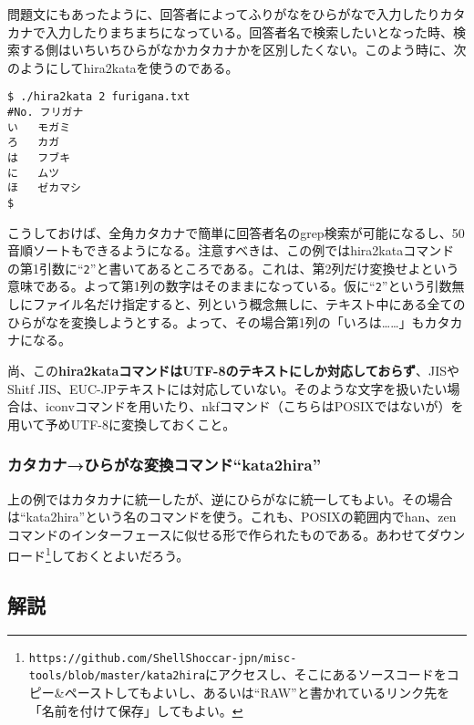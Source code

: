 問題文にもあったように、回答者によってふりがなをひらがなで入力したりカタカナで入力したりまちまちになっている。回答者名で検索したいとなった時、検索する側はいちいちひらがなかカタカナかを区別したくない。このよう時に、次のようにしてhira2kataを使うのである。
\begin{screen}
	\verb!$ ./hira2kata 2 furigana.txt! \return \\
	\verb|#No. フリガナ| \\
	\verb|い   モガミ| \\
	\verb|ろ   カガ| \\
	\verb|は   フブキ| \\
	\verb|に   ムツ| \\
	\verb|ほ   ゼカマシ| \\
	\verb|$ |
\end{screen}

こうしておけば、全角カタカナで簡単に回答者名のgrep検索が可能になるし、50音順ソートもできるようになる。注意すべきは、この例ではhira2kataコマンドの第1引数に``\verb|2|''と書いてあるところである。これは、第2列だけ変換せよという意味である。よって第1列の数字はそのままになっている。仮に``\verb|2|''という引数無しにファイル名だけ指定すると、列という概念無しに、テキスト中にある全てのひらがなを変換しようとする。よって、その場合第1列の「いろは……」もカタカナになる。

尚、この\textbf{hira2kataコマンドはUTF-8のテキストにしか対応しておらず}、JISやShitf JIS、EUC-JPテキストには対応していない。そのような文字を扱いたい場合は、iconvコマンドを用いたり、nkfコマンド（こちらはPOSIXではないが）を用いて予めUTF-8に変換しておくこと。

\subsubsection*{カタカナ→ひらがな変換コマンド``kata2hira''}

上の例ではカタカナに統一したが、逆にひらがなに統一してもよい。その場合は``kata2hira''という名のコマンドを使う。これも、POSIXの範囲内でhan、zenコマンドのインターフェースに似せる形で作られたものである。あわせてダウンロード\footnote{\verb|https://github.com/ShellShoccar-jpn/misc-tools/blob/master/kata2hira|にアクセスし、そこにあるソースコードをコピー\&{}ペーストしてもよいし、あるいは``RAW''と書かれているリンク先を「名前を付けて保存」してもよい。}しておくとよいだろう。

\subsection*{解説}

